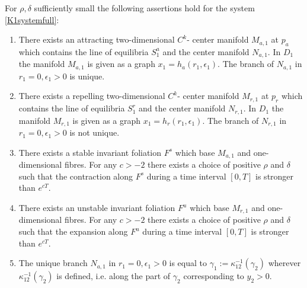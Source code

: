 \begin{prop}
For $\rho, \delta$ sufficiently small the following assertions hold for the system \ref{K1systemfull}:
\begin{enumerate}
\item There exists an attracting two-dimensional $C^k$- center manifold $M_{a,1}$ at $p_a$ which contains the line of equilibria $S_1^a$ and the center manifold $N_{a,1}$. In $D_1$ the manifold $M_{a,1}$ is given as a graph $x_1=h_a(r_1,\epsilon_1)$. The branch of $N_{a,1}$ in $r_1=0, \epsilon_1>0$ is unique.
\item There exists a repelling two-dimensional $C^k$- center manifold $M_{r,1}$ at $p_r$ which contains the line of equilibria $S_1^r$ and the center manifold $N_{r,1}$. In $D_1$ the manifold $M_{r,1}$ is given as a graph $x_1=h_r(r_1,\epsilon_1)$. The branch of $N_{r,1}$ in $r_1=0, \epsilon_1>0$ is not unique.
\item There exists a stable invariant foliation $F^s$ which base $M_{a,1}$ and one-dimensional fibres. For any $c>-2$ there exists a choice of positive $\rho$ and $\delta$ such that the contraction along $F^s$ during a time interval $[0,T]$ is stronger than $e^{cT}$.
\item There exists an unstable invariant foliation $F^u$ which base $M_{r,1}$ and one-dimensional fibres. For any $c>-2$ there exists a choice of positive $\rho$ and $\delta$ such that the expansion along $F^u$ during a time interval $[0,T]$ is stronger than $e^{cT}$.
\item The unique branch $N_{a,1}$ in $r_1=0, \epsilon_1>0$ is equal to $\gamma_1:= \kappa^{-1}_{12}(\gamma_2)$ wherever $\kappa^{-1}_{12}(\gamma_2)$ is defined, i.e. along the part of $\gamma_2$ corresponding to $y_2>0$.
\end{enumerate}
\end{prop}
 
